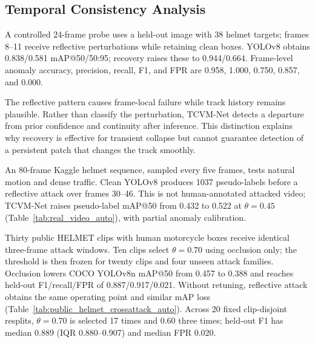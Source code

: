 \documentclass[runningheads,a4paper]{llncs}
\newcommand{\method}{TCVM-Net}
\begin{document}

\subsection{Temporal Consistency Analysis}
A controlled 24-frame probe uses a held-out image with 38 helmet targets; frames 8--11 receive reflective perturbations while retaining clean boxes. YOLOv8 obtains 0.838/0.581 mAP@50/50:95; recovery raises these to 0.944/0.664. Frame-level anomaly accuracy, precision, recall, F1, and FPR are 0.958, 1.000, 0.750, 0.857, and 0.000.

The reflective pattern causes frame-local failure while track history remains plausible. Rather than classify the perturbation, \method{} detects a departure from prior confidence and continuity after inference. This distinction explains why recovery is effective for transient collapse but cannot guarantee detection of a persistent patch that changes the track smoothly.

An 80-frame Kaggle helmet sequence, sampled every five frames, tests natural motion and dense traffic. Clean YOLOv8 produces 1037 pseudo-labels before a reflective attack over frames 30--46. This is not human-annotated attacked video; \method{} raises pseudo-label mAP@50 from 0.432 to 0.522 at $\theta=0.45$ (Table~\ref{tab:real_video_auto}), with partial anomaly calibration.


Thirty public HELMET clips with human motorcycle boxes receive identical three-frame attack windows. Ten clips select $\theta=0.70$ using occlusion only; the threshold is then frozen for twenty clips and four unseen attack families. Occlusion lowers COCO YOLOv8n mAP@50 from 0.457 to 0.388 and reaches held-out F1/recall/FPR of 0.887/0.917/0.021. Without retuning, reflective attack obtains the same operating point and similar mAP loss (Table~\ref{tab:public_helmet_crossattack_auto}). Across 20 fixed clip-disjoint resplits, $\theta=0.70$ is selected 17 times and $0.60$ three times; held-out F1 has median 0.889 (IQR 0.880--0.907) and median FPR 0.020.
\end{document}
